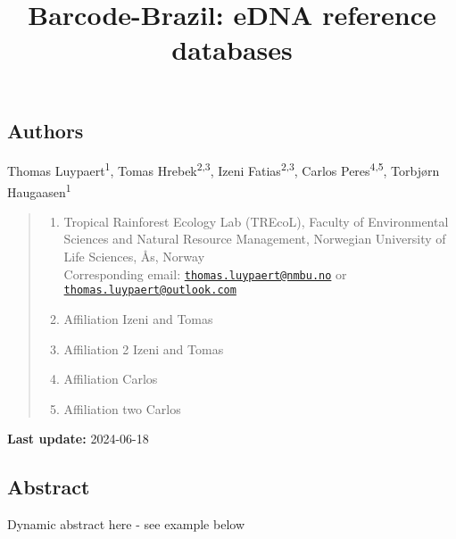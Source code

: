 \documentclass[
  letterpaper,
  DIV=11,
  numbers=noendperiod]{scrartcl}
\title{Barcode-Brazil: eDNA reference databases}
\author{}
\date{}
\begin{document}
\maketitle

\subsection{Authors}\label{authors}

Thomas Luypaert\textsuperscript{1}, Tomas Hrebek\textsuperscript{2,3},
Izeni Fatias\textsuperscript{2,3}, Carlos Peres\textsuperscript{4,5},
Torbjørn Haugaasen\textsuperscript{1}

\begin{quote}
\begin{enumerate}
\def\labelenumi{(\arabic{enumi})}
\item
  Tropical Rainforest Ecology Lab (TREcoL), Faculty of Environmental
  Sciences and Natural Resource Management, Norwegian University of Life
  Sciences, Ås, Norway\\
  Corresponding email:
  \href{mailto:thomas.luypaert@nmbu.no}{\nolinkurl{thomas.luypaert@nmbu.no}}
  or
  \href{mailto:thomas.luypaert@outlook.com}{\nolinkurl{thomas.luypaert@outlook.com}}
\item
  Affiliation Izeni and Tomas
\item
  Affiliation 2 Izeni and Tomas
\item
  Affiliation Carlos
\item
  Affiliation two Carlos
\end{enumerate}
\end{quote}

\textbf{Last update:} 2024-06-18

\subsection{Abstract}\label{abstract}

Dynamic abstract here - see example below
\end{document}
